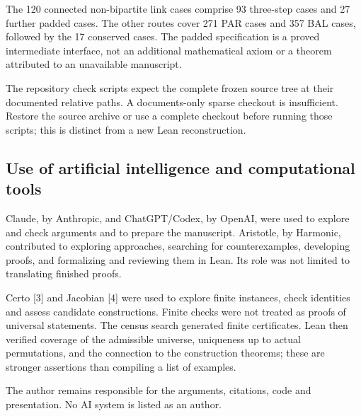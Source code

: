 \documentclass[english,11pt,a4paper]{article}
\begin{document}
The 120 connected non-bipartite link cases comprise 93 three-step cases and 27 further padded cases. The other routes cover 271 PAR cases and 357 BAL cases, followed by the 17 conserved cases. The padded specification is a proved intermediate interface, not an additional mathematical axiom or a theorem attributed to an unavailable manuscript.

The repository check scripts expect the complete frozen source tree at their documented relative paths. A documents-only sparse checkout is insufficient. Restore the source archive or use a complete checkout before running those scripts; this is distinct from a new Lean reconstruction.

\subsection{Use of artificial intelligence and computational tools}\label{use-of-artificial-intelligence-and-computational-tools}

Claude, by Anthropic, and ChatGPT/Codex, by OpenAI, were used to explore and check arguments and to prepare the manuscript. Aristotle, by Harmonic, contributed to exploring approaches, searching for counterexamples, developing proofs, and formalizing and reviewing them in Lean. Its role was not limited to translating finished proofs.

Certo {[}3{]} and Jacobian {[}4{]} were used to explore finite instances, check identities and assess candidate constructions. Finite checks were not treated as proofs of universal statements. The census search generated finite certificates. Lean then verified coverage of the admissible universe, uniqueness up to actual permutations, and the connection to the construction theorems; these are stronger assertions than compiling a list of examples.

The author remains responsible for the arguments, citations, code and presentation. No AI system is listed as an author.
\end{document}
